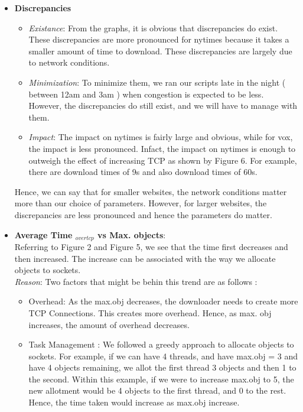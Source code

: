 \documentclass[12pt]{article}
\begin{document}
\begin{itemize}
\item \textbf{Discrepancies}\\
\begin{itemize}
\item \textit{Existance}: From the graphs, it is obvious that discrepancies do exist. These discrepancies are more pronounced for nytimes because it takes a smaller amount of time to download. These discrepancies are largely due to network conditions. 
\item \textit{Minimization}: To minimize them, we ran our scripts late in the night ( between 12am and 3am ) when congestion is expected to be less. However, the discrepancies do still exist, and we will have to manage with them. 
\item \textit{Impact}: The impact on nytimes is fairly large and obvious, while for vox, the impact is less pronounced. Infact, the impact on nytimes is enough to outweigh the effect of increasing TCP as shown by Figure 6. For example, there are download times of 9s and also download times of 60s.
\end{itemize}
Hence, we can say that for smaller websites, the network conditions matter more than our choice of parameters. However, for larger websites, the discrepancies are less pronounced and hence the parameters do matter.
\item \textbf{Average Time $_{over tcp}$ vs Max. objects}:\\ Referring to Figure 2 and Figure 5, we see that the time first decreases and then increased. The increase can be associated with the way we allocate objects to sockets.
\\ \textit{Reason}: Two factors that might be behin this trend are as follows : \begin{itemize}
\item Overhead: As the max.obj decreases, the downloader needs to create more TCP Connections. This creates more overhead. Hence, as max. obj increases, the amount of overhead decreases.
\item Task Management : We followed a greedy approach to allocate objects to sockets. For example, if we can have 4 threads, and have max.obj = 3 and have 4 objects remaining, we allot the first thread 3 objects and then 1 to the second. Within this example, if we were to increase max.obj to 5, the new allotment would be 4 objects to the first thread, and 0 to the rest. Hence, the time taken would increase as max.obj increase. 
\end{itemize}

\end{itemize}
\end{document}
